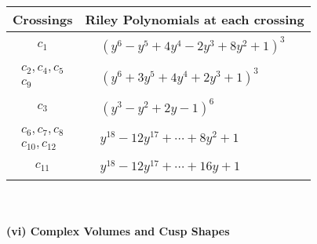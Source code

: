 \documentclass[1p]{elsarticle_modified}
\theoremstyle{definition}
\begin{document}
\begin{tabular}{m{50pt}|m{274pt}}
Crossings & \hspace{64pt}Riley Polynomials at each crossing \\
\hline $$\begin{aligned}c_{1}\end{aligned}$$&$\begin{aligned}
&(y^6- y^5+4 y^4-2 y^3+8 y^2+1)^3
\end{aligned}$\\
\hline $$\begin{aligned}c_{2},c_{4},c_{5}\\c_{9}\end{aligned}$$&$\begin{aligned}
&(y^6+3 y^5+4 y^4+2 y^3+1)^3
\end{aligned}$\\
\hline $$\begin{aligned}c_{3}\end{aligned}$$&$\begin{aligned}
&(y^3- y^2+2 y-1)^6
\end{aligned}$\\
\hline $$\begin{aligned}c_{6},c_{7},c_{8}\\c_{10},c_{12}\end{aligned}$$&$\begin{aligned}
&y^{18}-12 y^{17}+\cdots+8 y^2+1
\end{aligned}$\\
\hline $$\begin{aligned}c_{11}\end{aligned}$$&$\begin{aligned}
&y^{18}-12 y^{17}+\cdots+16 y+1
\end{aligned}$\\
\hline
\end{tabular}\\~\\
\newpage\flushleft \textbf{(vi) Complex Volumes and Cusp Shapes}
\end{document}
